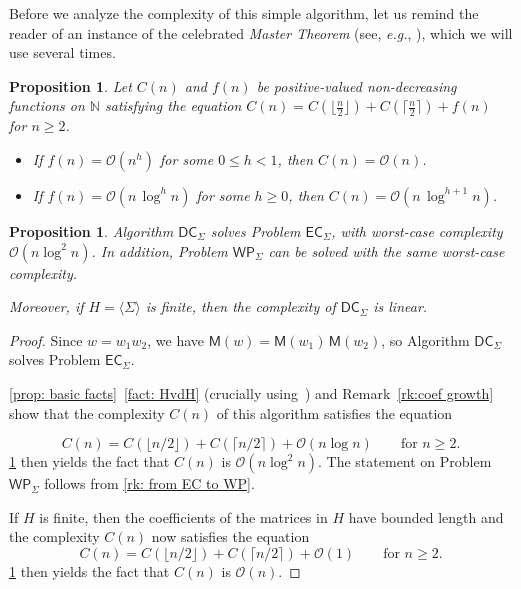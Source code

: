 \documentclass{article}
\def\O{\mathcal{O}}
\def\N{\mathbb{N}}
\def\DC{\textsf{DC}}
\def\EC{\textsf{EC}}
\def\WP{\textsf{WP}}
\def\mat{\textsf{M}}
\theoremstyle{plain}
\newtheorem{proposition}[theorem]{Proposition}
\theoremstyle{definition}
\begin{document}
\medskip

Before we analyze the complexity of this simple algorithm, let us remind the reader of an instance of the celebrated \emph{Master Theorem} (see, \textit{e.g.}, \cite[Theorem 4.1]{cormen2022introduction}), which we will use several times.

\begin{proposition}\label{prop: master theorem}
    Let $C(n)$ and $f(n)$ be positive-valued non-decreasing functions on $\N$ satisfying the equation $C(n) = C(\lfloor \frac n2\rfloor) + C(\lceil \frac n2\rceil) + f(n)$ for $n\geq 2$.
    \begin{itemize}
        \item If $f(n) = \O(n^h)$ for some $0 \leq h < 1$, then $C(n) = \O(n)$.
        \item If $f(n) = \O(n\,\log^hn)$ for some $h \geq 0$, then $C(n) = \O(n\,\log^{h+1}n)$.
    \end{itemize}
\end{proposition}    

\begin{proposition}\label{prop: complexity DC}
%
Algorithm $\DC_\Sigma$ solves Problem $\EC_\Sigma$, with worst-case complexity $\O(n\log^2n)$. In addition, Problem $\WP_\Sigma$ can be solved with the same worst-case complexity. 

Moreover, if $H = \langle\Sigma\rangle$ is finite, then the complexity of $\DC_\Sigma$ is linear.
%
\end{proposition}

\begin{proof}
%
Since $w = w_1w_2$, we have $\mat(w) = \mat(w_1)\,\mat(w_2)$, so Algorithm $\DC_\Sigma$ solves Problem $\EC_\Sigma$. 

\cref{prop: basic facts}~\eqref{fact: HvdH} (crucially using~\cite{harvey2021integer}) and Remark~\ref{rk:coef growth} show that the complexity $C(n)$ of this algorithm satisfies the equation

\begin{equation}
    C(n) = C\left(\lfloor n/2\rfloor\right) + C\left(\lceil n/2\rceil\right) + \O(n\log n) \qquad\text{for } n\geq 2.
\end{equation}
%
\cref{prop: master theorem} then yields the fact that $C(n)$ is $\O(n\log^2n)$. The statement on Problem $\WP_\Sigma$ follows from \cref{rk: from EC to WP}.

If $H$ is finite, then the coefficients of the matrices in $H$ have bounded length and the complexity $C(n)$ now satisfies the equation
\begin{equation}
    C(n) = C\left(\lfloor n/2\rfloor\right) + C\left(\lceil n/2\rceil\right) + \O(1) \qquad\text{for } n\geq 2.
\end{equation}
%
\cref{prop: master theorem} then yields the fact that $C(n)$ is $\O(n)$.
%
\end{proof}
\end{document}
